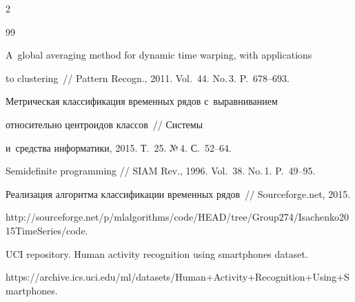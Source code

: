 \begin{multicols}{2}
{{\begin{thebibliography}{99}




A~global averaging method for dynamic time warping, with applications


  to clustering~// Pattern Recogn., 2011. Vol.~44. No.\,3. P.~678--693.









Метрическая классификация временных рядов с~выравниванием


  относительно центроидов классов~// Системы 


  и~средства информатики, 2015. Т.~25. №\,4. С.~52--64.









Semidefinite programming // SIAM Rev., 1996. Vol.~38. No.\,1. P.~49--95.









Реализация алгоритма классификации временных рядов~// Sourceforge.net, 2015.


{\sf http://sourceforge.net/p/mlalgorithms/code/HEAD/\linebreak tree/Group274/Isachenko2015TimeSeries/code}.










UCI repository. Human activity recognition using smartphones dataset.


{\sf https://archive.ics.uci.edu/\linebreak ml/datasets/Human+Activity+Recognition+Using+\linebreak Smartphones}.


\end{thebibliography}





 }


 }





\end{multicols}





